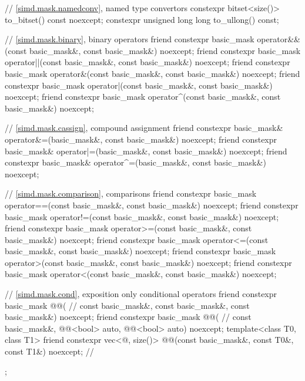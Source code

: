 \begin{codeblock}
{{    // \ref{simd.mask.namedconv},  named type convertors
    constexpr bitset<size()> to_bitset() const noexcept;
    constexpr unsigned long long to_ullong() const;

    // \ref{simd.mask.binary},  binary operators
    friend constexpr basic_mask
      operator&&(const basic_mask&, const basic_mask&) noexcept;
    friend constexpr basic_mask
      operator||(const basic_mask&, const basic_mask&) noexcept;
    friend constexpr basic_mask
      operator&(const basic_mask&, const basic_mask&) noexcept;
    friend constexpr basic_mask
      operator|(const basic_mask&, const basic_mask&) noexcept;
    friend constexpr basic_mask
      operator^(const basic_mask&, const basic_mask&) noexcept;

    // \ref{simd.mask.cassign},  compound assignment
    friend constexpr basic_mask&
      operator&=(basic_mask&, const basic_mask&) noexcept;
    friend constexpr basic_mask&
      operator|=(basic_mask&, const basic_mask&) noexcept;
    friend constexpr basic_mask&
      operator^=(basic_mask&, const basic_mask&) noexcept;

    // \ref{simd.mask.comparison},  comparisons
    friend constexpr basic_mask
      operator==(const basic_mask&, const basic_mask&) noexcept;
    friend constexpr basic_mask
      operator!=(const basic_mask&, const basic_mask&) noexcept;
    friend constexpr basic_mask
      operator>=(const basic_mask&, const basic_mask&) noexcept;
    friend constexpr basic_mask
      operator<=(const basic_mask&, const basic_mask&) noexcept;
    friend constexpr basic_mask
      operator>(const basic_mask&, const basic_mask&) noexcept;
    friend constexpr basic_mask
      operator<(const basic_mask&, const basic_mask&) noexcept;

    // \ref{simd.mask.cond},  exposition only conditional operators
    friend constexpr basic_mask @@( // \expos
      const basic_mask&, const basic_mask&, const basic_mask&) noexcept;
    friend constexpr basic_mask @@( // \expos
      const basic_mask&, @@<bool> auto, @@<bool> auto) noexcept;
    template<class T0, class T1>
      friend constexpr vec<@\seebelow@, size()>
        @@(const basic_mask&, const T0&, const T1&) noexcept; // \expos
  };
}
\end{codeblock}

